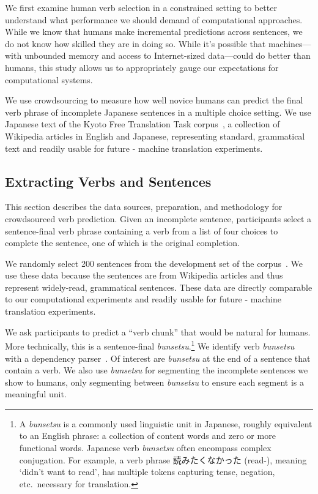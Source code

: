 
We first examine human verb selection in a constrained setting to better
understand what performance we should demand of computational approaches.  While
we know that humans make incremental predictions across sentences, we do not
know how skilled they are in doing so. While it's possible that machines---with
unbounded memory and access to Internet-sized data---could do better than
humans, this study allows us to appropriately gauge our expectations for
computational systems.

We use crowdsourcing to measure how well novice humans can predict the final
verb phrase of incomplete Japanese sentences in a multiple choice setting.  We
use Japanese text of the Kyoto Free Translation Task
corpus~\cite[]{neubig2011kyoto}, a collection of Wikipedia articles in
English and Japanese, representing standard, grammatical text and readily usable
for future - machine translation experiments.

\subsection{Extracting Verbs and Sentences}
\label{sec:human_prediction}

This section describes the data sources, preparation, and methodology
for crowdsourced verb prediction.  Given an incomplete sentence,
participants select a sentence-final verb phrase containing a verb
from a list of four choices to complete the sentence, one of which is
the original completion.

We randomly select 200 sentences from the development set of the
 corpus~\cite{neubig2011kyoto}.  We use these data because the
sentences are from Wikipedia articles and thus represent widely-read,
grammatical sentences.  These data are directly comparable to our computational
experiments and readily usable for future - machine translation
experiments.

We ask participants to predict a ``verb chunk'' that would be natural
for humans.  More technically, this is a
sentence-final \emph{bunsetsu}.\footnote{{A \it bunsetsu} is a commonly
used linguistic unit in Japanese, roughly equivalent to an English
phrase: a collection of content words and zero or more functional
words. Japanese verb \textit{bunsetsu} often encompass complex
conjugation. For example, a verb phrase 読みたくなかった
(read-), meaning `didn't want to read', has
multiple tokens capturing tense, negation, etc.\ necessary for
translation.}  We identify verb \textit{bunsetsu} with a dependency
parser~\cite{kurohashi1994kn}.  Of interest are \textit{bunsetsu} at
the end of a sentence that contain a verb.  We also use
\textit{bunsetsu} for segmenting the incomplete sentences we show to
humans, only segmenting between \textit{bunsetsu} to ensure each
segment is a meaningful unit.

